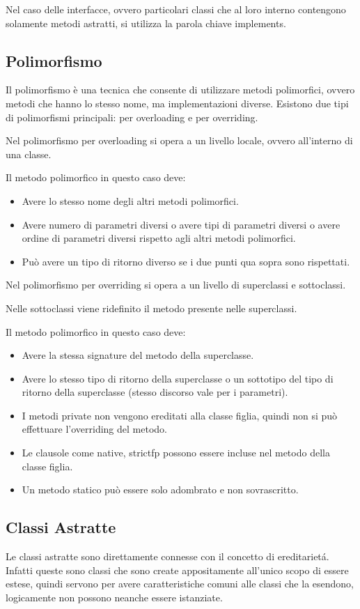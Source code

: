 \documentclass[a4paper,12pt,times,numbered,print,index]{article}
\begin{document}
Nel caso delle interfacce, ovvero particolari classi che al loro interno contengono solamente metodi astratti, si utilizza la parola chiave implements.
\textcite{corsoinformatica}

\subsection{Polimorfismo}
Il polimorfismo è una tecnica che consente di utilizzare metodi polimorfici, ovvero metodi che hanno lo stesso nome, ma implementazioni diverse.
Esistono due tipi di polimorfismi principali: per overloading e per overriding.

Nel polimorfismo per overloading si opera a un livello locale, ovvero all’interno di una classe.

Il metodo polimorfico in questo caso deve:
\begin{itemize}
	\item Avere lo stesso nome degli altri metodi polimorfici.
	\item Avere numero di parametri diversi o avere tipi di parametri diversi o avere ordine di parametri diversi rispetto agli altri metodi polimorfici.
	\item Può avere un tipo di ritorno diverso se i due punti qua sopra sono rispettati.
\end{itemize}
Nel polimorfismo per overriding si opera a un livello di superclassi e sottoclassi.

Nelle sottoclassi viene ridefinito il metodo presente nelle superclassi.

Il metodo polimorfico in questo caso deve:
\begin{itemize}
	\item Avere la stessa signature del metodo della superclasse.
	\item Avere lo stesso tipo di ritorno della superclasse o un sottotipo del tipo di ritorno della superclasse (stesso discorso vale per i parametri).
	\item I metodi private non vengono ereditati alla classe figlia, quindi non si può effettuare l’overriding del metodo.
	\item Le clausole come native, strictfp possono essere incluse nel metodo della classe figlia.
	\item Un metodo statico può essere solo adombrato e non sovrascritto.
\end{itemize}
\textcite{polimorfismo}

\subsection{Classi Astratte}
Le classi astratte sono direttamente connesse con il concetto di ereditarietá. Infatti queste sono classi che sono create appositamente all'unico scopo di essere estese, quindi servono per avere caratteristiche comuni alle classi che la esendono, logicamente non possono neanche essere istanziate.
\end{document}
